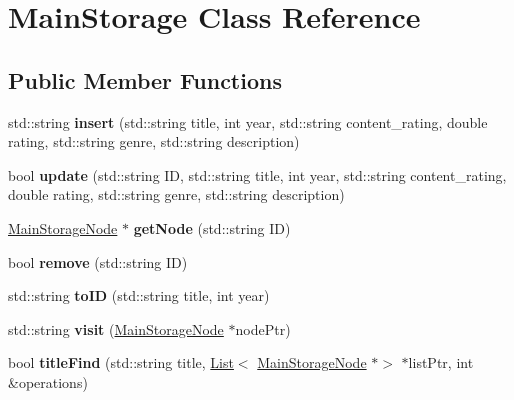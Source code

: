 \hypertarget{class_main_storage}{}\section{Main\+Storage Class Reference}
\label{class_main_storage}
\subsection*{Public Member Functions}
\begin{DoxyCompactItemize}
\item 
\mbox{\label{class_main_storage_a44c622afdd8c4c8a897394587d08348c}} 
std\+::string {\bfseries insert} (std\+::string title, int year, std\+::string content\+\_\+rating, double rating, std\+::string genre, std\+::string description)
\item 
\mbox{\label{class_main_storage_a671382444b8ef74cee4f40b250abf48c}} 
bool {\bfseries update} (std\+::string ID, std\+::string title, int year, std\+::string content\+\_\+rating, double rating, std\+::string genre, std\+::string description)
\item 
\mbox{\label{class_main_storage_a2b4e41b68af000474264b89e37fe2c07}} 
\hyperlink{class_main_storage_node}{Main\+Storage\+Node} $\ast$ {\bfseries get\+Node} (std\+::string ID)
\item 
\mbox{\label{class_main_storage_a673ae2af870359aaaf9ae60a4be4974d}} 
bool {\bfseries remove} (std\+::string ID)
\item 
\mbox{\label{class_main_storage_a6c296b9807bd66ac45495ab7d033db28}} 
std\+::string {\bfseries to\+ID} (std\+::string title, int year)
\item 
\mbox{\label{class_main_storage_af0bbc44a648395b758a8f8664d7b1fa6}} 
std\+::string {\bfseries visit} (\hyperlink{class_main_storage_node}{Main\+Storage\+Node} $\ast$node\+Ptr)
\item 
\mbox{\label{class_main_storage_a76cc264ecdf371b16ebf57bd3be1476e}} 
bool {\bfseries title\+Find} (std\+::string title, \hyperlink{class_list}{List}$<$ \hyperlink{class_main_storage_node}{Main\+Storage\+Node} $\ast$$>$ $\ast$list\+Ptr, int \&operations)
$$
\end{DoxyCompactItemize}
